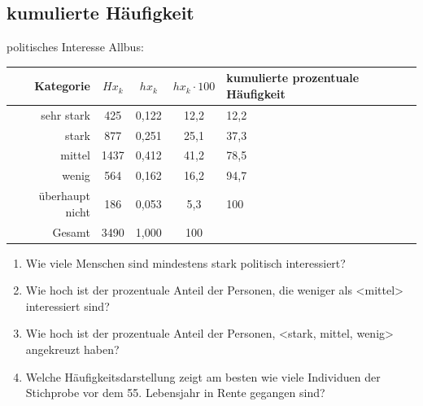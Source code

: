\subsection{kumulierte Häufigkeit}
politisches Interesse Allbus:\\
\begin{tabular}[h]{r|c|c|c|l}
        Kategorie   & $Hx_k$    &  $hx_k$   &  $hx_k \cdot 100$ & kumulierte prozentuale Häufigkeit  \\
  \hline
	sehr stark  & 425       & 0,122    & 12,2 & 12,2\\
        stark       & 877       & 0,251    & 25,1 & 37,3\\
        mittel      & 1437      & 0,412    & 41,2 & 78,5\\
        wenig       & 564       & 0,162    & 16,2 & 94,7\\
überhaupt nicht     & 186       & 0,053    & 5,3  & 100\\
  \hline
	Gesamt & 3490 & 1,000 & 100 & {}\\
\end{tabular}
\begin{enumerate}
\item Wie viele Menschen sind mindestens stark politisch interessiert? 
\item Wie hoch ist der prozentuale Anteil der Personen, die weniger als <mittel> interessiert sind? 
\item Wie hoch ist der prozentuale Anteil der Personen, <stark, mittel, wenig> angekreuzt haben? 
\item Welche Häufigkeitsdarstellung zeigt am besten wie viele Individuen der Stichprobe vor dem 55. Lebensjahr in Rente gegangen sind? 
\end{enumerate}

